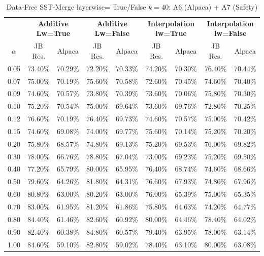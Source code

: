 \begin{table}[h]
\centering
\caption{Data-Free SST-Merge layerwise= True/False $k=40$: A6 (Alpaca) + A7 (Safety)}
\label{tab:res_a6_a7_data_free_sst_40}
\begin{tabular}{c|cc|cc|cc|cc}
\hline
 & \multicolumn{2}{c|}{\textbf{Additive Lw=True}} & \multicolumn{2}{c|}{\textbf{Additive Lw=False}} & \multicolumn{2}{c|}{\textbf{Interpolation lw=True}}& \multicolumn{2}{c}{\textbf{Interpolation lw=False}} \\
$\alpha$ & JB Res. & Alpaca & JB Res. & Alpaca & JB Res. & Alpaca & JB Res. & Alpaca \\
\hline
0.05 & 73.40\% & 70.29\% & 72.20\% & 70.33\% & 74.20\% & 70.30\% & 76.40\% & 70.44\% \\
0.07 & 75.00\% & 70.19\% & 75.60\% & 70.58\% & 72.60\% & 70.45\% & 74.60\% & 70.40\% \\
0.09 & 74.60\% & 70.57\% & 73.80\% & 70.39\% & 73.60\% & 70.06\% & 75.80\% & 70.30\% \\
0.10 & 75.20\% & 70.54\% & 75.00\% & 69.64\% & 73.60\% & 69.76\% & 72.80\% & 70.25\% \\
0.12 & 76.60\% & 70.19\% & 76.40\% & 69.73\% & 74.60\% & 70.57\% & 75.00\% & 70.42\% \\
0.15 & 74.60\% & 69.08\% & 74.00\% & 69.77\% & 75.60\% & 70.14\% & 75.20\% & 70.20\% \\
0.20 & 75.80\% & 68.57\% & 74.80\% & 69.13\% & 75.20\% & 69.53\% & 76.00\% & 69.82\% \\
0.30 & 78.00\% & 66.76\% & 78.80\% & 67.04\% & 73.00\% & 69.23\% & 75.20\% & 69.50\% \\
0.40 & 77.20\% & 65.79\% & 80.00\% & 65.95\% & 76.40\% & 68.74\% & 74.60\% & 68.66\% \\
0.50 & 79.60\% & 64.26\% & 81.80\% & 64.31\% & 76.60\% & 67.93\% & 74.80\% & 67.96\% \\
0.60 & 80.80\% & 63.00\% & 80.20\% & 63.00\% & 76.00\% & 65.39\% & 75.00\% & 65.35\% \\
0.70 & 83.00\% & 61.95\% & 81.20\% & 61.86\% & 75.80\% & 64.63\% & 74.20\% & 64.77\% \\
0.80 & 84.40\% & 61.46\% & 82.60\% & 60.92\% & 80.00\% & 64.46\% & 78.40\% & 64.02\% \\
0.90 & 82.40\% & 60.38\% & 84.80\% & 60.57\% & 79.40\% & 63.95\% & 78.00\% & 63.14\% \\
1.00 & 84.60\% & 59.10\% & 82.80\% & 59.02\% & 78.40\% & 63.10\% & 80.00\% & 63.08\% \\
\hline
\end{tabular}
\end{table}
\FloatBarrier

